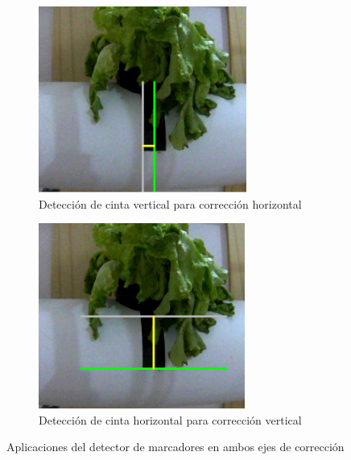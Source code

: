 \begin{figure}[H]
\centering
\begin{subfigure}[b]{0.48\textwidth}
    \centering
    \includegraphics[width=\textwidth]{imagenes/detector_marcadores_5_lineas_verticales.png}
    \caption{Detección de cinta vertical para corrección horizontal}
\end{subfigure}
\hfill
\begin{subfigure}[b]{0.48\textwidth}
    \centering
    \includegraphics[width=\textwidth]{imagenes/detector_marcadores_5_lineas_horizontales.png}
    \caption{Detección de cinta horizontal para corrección vertical}
\end{subfigure}
\caption{Aplicaciones del detector de marcadores en ambos ejes de corrección}
\label{fig:aplicaciones_marcadores}
\end{figure}

